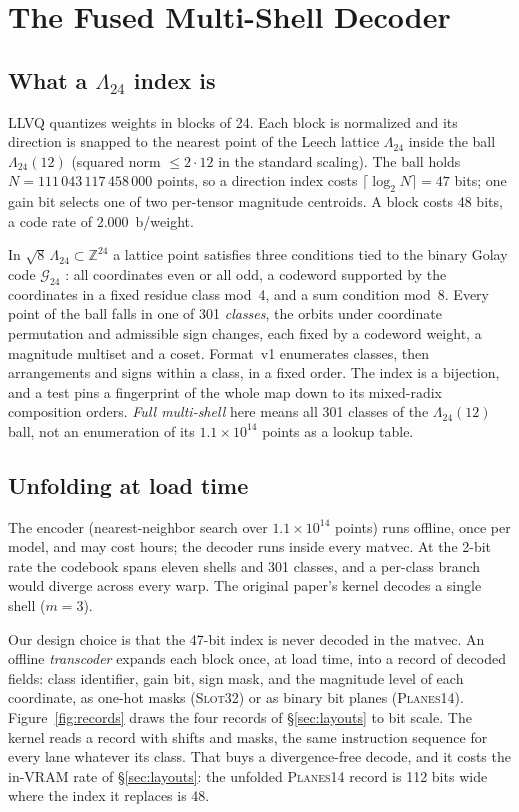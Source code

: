 \section{The Fused Multi-Shell Decoder}
\label{sec:decoder}

\subsection{What a $\Lambda_{24}$ index is}

LLVQ quantizes weights in blocks of 24. Each block is normalized and its
direction is snapped to the nearest point of the Leech lattice
$\Lambda_{24}$ inside the ball $\Lambda_{24}(12)$ (squared norm
$\le 2\cdot 12$ in the standard scaling). The ball holds
$N = 111\,043\,117\,458\,000$ points, so a direction index costs
$\lceil\log_2 N\rceil = 47$ bits; one gain bit selects one of two
per-tensor magnitude centroids. A block costs 48 bits, a code rate of
2.000~b/weight.

In $\sqrt{8}\,\Lambda_{24}\subset\mathbb{Z}^{24}$ a lattice point satisfies
three conditions tied to the binary Golay code $\mathcal{G}_{24}$
\citep{conway1999sphere}: all coordinates even or all odd, a codeword
supported by the coordinates in a fixed residue class mod~4, and a sum
condition mod~8. Every point of the ball falls in one of 301
\emph{classes}, the orbits under coordinate permutation and admissible sign
changes, each fixed by a codeword weight, a magnitude multiset and a coset.
Format~v1 enumerates classes, then arrangements and signs within a class, in
a fixed order. The index is a bijection, and a test pins a fingerprint of
the whole map down to its mixed-radix composition orders. \emph{Full
multi-shell} here means all 301 classes of the $\Lambda_{24}(12)$ ball, not
an enumeration of its $1.1\times10^{14}$ points as a lookup table.

\subsection{Unfolding at load time}

The encoder (nearest-neighbor search over $1.1\times10^{14}$ points) runs
offline, once per model, and may cost hours; the decoder runs inside every
matvec. At the 2-bit rate the codebook spans eleven shells and 301 classes,
and a per-class branch would diverge across every warp. The original
paper's kernel decodes a single shell ($m=3$).

Our design choice is that the 47-bit index is never decoded in the matvec.
An offline \emph{transcoder} expands each block once, at load time, into a
record of decoded fields: class identifier, gain bit, sign mask, and the
magnitude level of each coordinate, as one-hot masks (\textsc{Slot32}) or
as binary bit planes (\textsc{Planes14}). Figure~\ref{fig:records} draws
the four records of \S\ref{sec:layouts} to bit scale. The kernel reads a
record with shifts and masks, the same instruction sequence for every lane
whatever its class. That buys a divergence-free decode, and it costs the
in-VRAM rate of \S\ref{sec:layouts}: the unfolded \textsc{Planes14} record
is 112 bits wide where the index it replaces is 48.

